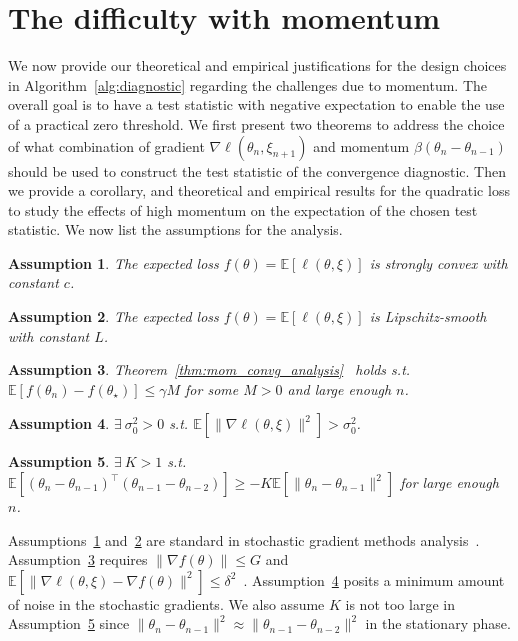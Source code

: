 \documentclass[conference]{IEEEtran}
\newcommand{\Ex}[1]{\mathbb{E}[ #1 ]}
\newtheorem{assumption}{Assumption}
\begin{document}
\section{The difficulty with momentum}\label{sec:momentum-stationarity}\label{sec:high_momentum_ip}

We now provide our theoretical and empirical justifications for the design choices in Algorithm~\ref{alg:diagnostic} regarding the challenges due to momentum.
The overall goal is to have a test statistic with negative expectation to enable the use of a practical zero threshold. We first present two theorems to address the choice of what combination of gradient $\nabla \ell (\theta_n, \xi_{n+1})$ and momentum $\beta (\theta_n - \theta_{n-1})$ should be used to construct the test statistic of the convergence diagnostic. Then we provide a corollary, and theoretical and empirical results for the quadratic loss to study the effects of high momentum on the expectation of the chosen test statistic.
We now list the assumptions for the analysis.
\begin{assumption}
\label{assump:strcvx}
The expected loss $f(\theta) = \Ex{ \ell(\theta, \xi) }$ is strongly convex with constant $c$.
\end{assumption}

\begin{assumption}
\label{assump:Lsmooth}
The expected loss $f(\theta) = \Ex{ \ell(\theta, \xi) }$ is Lipschitz-smooth with constant $L$.
\end{assumption}

\begin{assumption}
\label{assump:Fbound}
Theorem~\ref{thm:mom_convg_analysis}~\cite{yang2016unified} holds s.t. $\Ex{ f(\theta_n) - f(\theta_\star) } \leq \gamma M$ for some $M > 0$ and large enough $n$. 
\end{assumption}

\begin{assumption}
\label{assump:min_noise} 
$\exists \ \sigma_0^2 > 0$ s.t. $\Ex{ \| \nabla \ell (\theta, \xi) \|^2 } > \sigma_0^2$.
\end{assumption}

\begin{assumption}
\label{assump:scaling}
$\exists \ K > 1$ s.t. $\Ex{ (\theta_n - \theta_{n-1})^\top (\theta_{n-1} - \theta_{n-2}) } \geq - K \Ex{ \| \theta_n - \theta_{n-1} \|^2 }$ for large enough $n$.
\end{assumption}

Assumptions~\ref{assump:strcvx} and~\ref{assump:Lsmooth} are standard in stochastic gradient methods analysis~\cite{Bach_NIPS13,Proc:Bach_NIPS11}. 
Assumption~\ref{assump:Fbound} requires $\| \nabla f(\theta) \| \leq G$ and $\Ex{ \| \nabla \ell(\theta, \xi) - \nabla f(\theta) \|^2 } \leq \delta^2$~\cite{yang2016unified}. 
Assumption~\ref{assump:min_noise} posits a minimum amount of noise in the stochastic gradients. 
We also assume $K$ is not too large in Assumption~\ref{assump:scaling} since $\| \theta_n - \theta_{n-1} \|^2 \approx \| \theta_{n-1} - \theta_{n-2} \|^2$ in the stationary phase.
\end{document}
